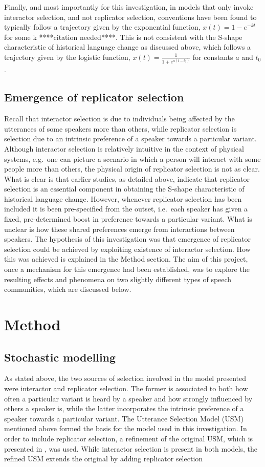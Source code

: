 \documentclass[12pt]{article}
\begin{document}
Finally, and most importantly for this investigation, in models that only invoke interactor selection, and not replicator selection, conventions have been found to typically follow a trajectory given by the exponential function, $x(t) = 1 − e^{−kt}$ for some k ****citation needed****. This is not consistent with the S-shape characteristic of historical language change as discussed above, which follows a trajectory given by the logistic function, $x(t) = \frac{1}{1 + e^{a(t-t_0)}}$ for constants $a$ and $t_0$ \cite{ref2}. 

\subsection{Emergence of replicator selection}
Recall that interactor selection is due to individuals being affected by the utterances of some speakers more than others, while replicator selection is selection due to an intrinsic preference of a speaker towards a particular variant. Although interactor selection is relatively intuitive in the context of physical systems, e.g.\ one can picture a scenario in which a person will interact with some people more than others, the physical origin of replicator selection is not as clear. What is clear is that earlier studies, as detailed above, indicate that replicator selection is an essential component in obtaining the S-shape characteristic of historical language change. However, whenever replicator selection has been included it is been pre-specified from the outset, i.e.\ each speaker has given a fixed, pre-determined boost in preference towards a particular variant. What is unclear is how these shared preferences emerge from interactions between speakers. The hypothesis of this investigation was that emergence of replicator selection could be achieved by exploiting existence of interactor selection. How this was achieved is explained in the Method section. The aim of this project, once a mechanism for this emergence had been established, was to explore the resulting effects and phenomena on two slightly different types of speech communities, which are discussed below.

\newpage
\section{Method}


\subsection{Stochastic modelling}
As stated above, the two sources of selection involved in the model presented were interactor and replicator selection. The former is associated to both how often a particular variant is heard by a speaker and how strongly influenced by others a speaker is, while the latter incorporates the intrinsic preference of a speaker towards a particular variant. The Utterance Selection Model (USM) mentioned above formed the basis for the model used in this investigation. In order to include replicator selection, a refinement of the original USM, which is presented in \cite{refined}, was used. While interactor selection is present in both models, the refined USM extends the original by adding replicator selection
\end{document}
